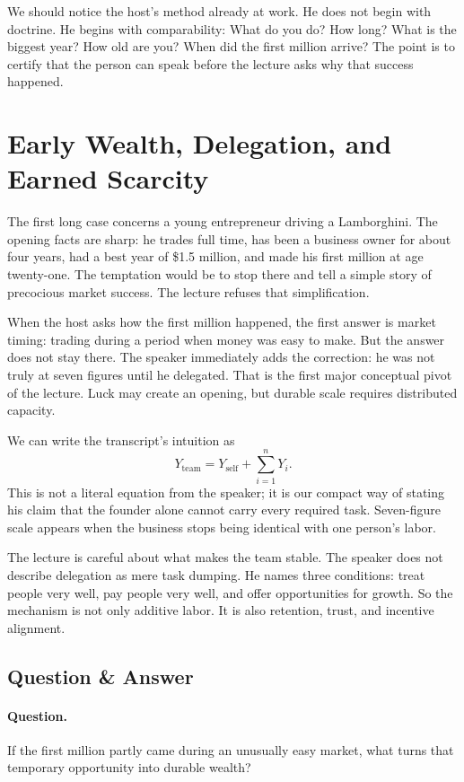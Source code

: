 We should notice the host's method already at work. He does not begin with doctrine. He begins with comparability: What do you do? How long? What is the biggest year? How old are you? When did the first million arrive? The point is to certify that the person can speak before the lecture asks why that success happened.

\section{Early Wealth, Delegation, and Earned Scarcity}

The first long case concerns a young entrepreneur driving a Lamborghini. The opening facts are sharp: he trades full time, has been a business owner for about four years, had a best year of \$1.5 million, and made his first million at age twenty-one. The temptation would be to stop there and tell a simple story of precocious market success. The lecture refuses that simplification.

When the host asks how the first million happened, the first answer is market timing: trading during a period when money was easy to make. But the answer does not stay there. The speaker immediately adds the correction: he was not truly at seven figures until he delegated. That is the first major conceptual pivot of the lecture. Luck may create an opening, but durable scale requires distributed capacity.

We can write the transcript's intuition as
\begin{equation}
Y_{\mathrm{team}} = Y_{\mathrm{self}} + \sum_{i=1}^{n} Y_i.
\end{equation}
This is not a literal equation from the speaker; it is our compact way of stating his claim that the founder alone cannot carry every required task. Seven-figure scale appears when the business stops being identical with one person's labor.

The lecture is careful about what makes the team stable. The speaker does not describe delegation as mere task dumping. He names three conditions: treat people very well, pay people very well, and offer opportunities for growth. So the mechanism is not only additive labor. It is also retention, trust, and incentive alignment.

\subsection{Question \& Answer}

\paragraph{Question.} If the first million partly came during an unusually easy market, what turns that temporary opportunity into durable wealth?

